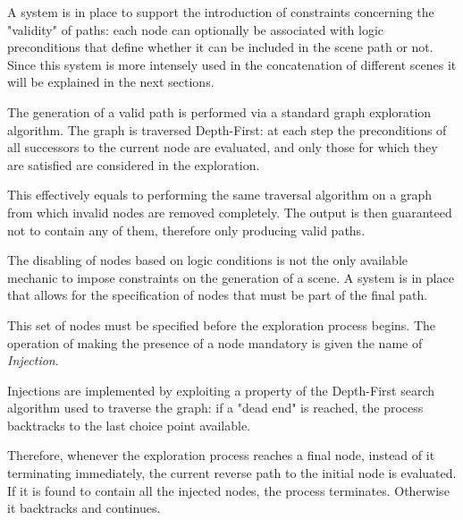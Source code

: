 \documentclass[12pt,a4paper,oneside]{report}
\begin{document}
\bigskip

A system is in place to support the introduction of constraints concerning the "validity" of paths: each node can optionally be associated with logic preconditions that define whether it can be included in the scene path or not. Since this system is more intensely used in the concatenation of different scenes it will be explained in the next sections.

The generation of a valid path is performed via a standard graph exploration algorithm. The graph is traversed Depth-First: at each step the preconditions of all successors to the current node are evaluated, and only those for which they are satisfied are considered in the exploration.

This effectively equals to performing the same traversal algorithm on a graph from which invalid nodes are removed completely. The output is then guaranteed not to contain any of them, therefore only producing valid paths.

\bigskip

The disabling of nodes based on logic conditions is not the only available mechanic to impose constraints on the generation of a scene. A system is in place that allows for the specification of nodes that must be part of the final path. 

This set of nodes must be specified before the exploration process begins. The operation of making the presence of a node mandatory is given the name of \textit{Injection}.

Injections are implemented by exploiting a property of the Depth-First search algorithm used to traverse the graph: if a "dead end" is reached, the process backtracks to the last choice point available.

Therefore, whenever the exploration process reaches a final node, instead of it terminating immediately, the current reverse path to the initial node is evaluated. If it is found to contain all the injected nodes, the process terminates. Otherwise it backtracks and continues.

\bigskip
\end{document}
